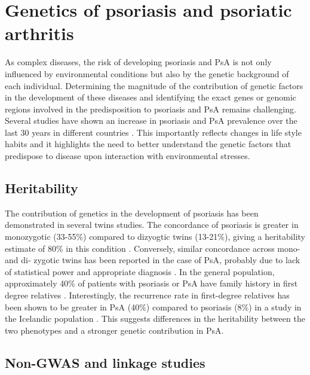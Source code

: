
 

\section{Genetics of psoriasis and psoriatic arthritis}

As complex diseases, the risk of developing psoriasis and PsA is not only influenced by environmental conditions but also by the genetic background of each individual. Determining the magnitude of the contribution of genetic factors in the development of these diseases and identifying the exact genes or genomic regions involved in the predisposition to psoriasis and PsA remains challenging.  Several studies have shown an increase in psoriasis and PsA prevalence over the last 30 years in different countries \parencite{Organization2016}. This importantly reflects changes in life style habits and it highlights the need to better understand the genetic factors that predispose to disease upon interaction with environmental stresses.


\subsection{Heritability}

The contribution of genetics in the development of psoriasis has been demonstrated in several twins studies. The concordance of psoriasis is greater in monozygotic (33-55\%) compared to dizyogtic twins (13-21\%), giving a heritability estimate of 80\% in this condition \parencite{Faber1974, Duffy1993, Pendersen2008}. Conversely, similar concordance across mono- and di- zygotic twins has been reported in the case of PsA, probably due to lack of statistical power and appropriate diagnosis \parencite{Pendersen2008}. In the general population, approximately 40\% of patients with psoriasis or PsA have family history in first degree relatives \parencite{Gladman1986}. Interestingly, the recurrence rate in first-degree relatives has been shown to be greater in PsA (40\%) compared to psoriasis (8\%) in a study in the Icelandic population \parencite{Chandran2009}. This suggests differences in the heritability between the two phenotypes and a stronger genetic contribution in PsA.


\subsection{Non-GWAS and linkage studies}

